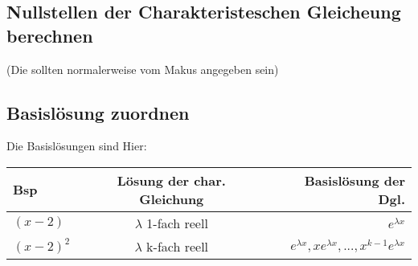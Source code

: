 \documentclass[a4paper, 12pt]{article}
\begin{document}
	\subsection {Nullstellen der Charakteristeschen Gleicheung berechnen}

	(Die sollten normalerweise vom Makus angegeben sein) \newline
	\newline

	\subsection {Basislösung zuordnen}

	Die Basislösungen sind Hier:\newline
	\begin{tabular} {l | c | r}
	Bsp & Lösung der char. Gleichung &  Basislösung der Dgl. \\
		\hline
		$(x-2) $ & $\lambda$ 1-fach reell & $e^{\lambda x} $ \\
			$(x-2)^2$ & $\lambda$ k-fach reell & $ e^{\lambda x }, x e^{\lambda x},..., x^{k-1} e^{\lambda x}$ \\  
			\end{tabular}

			
\end{document}
